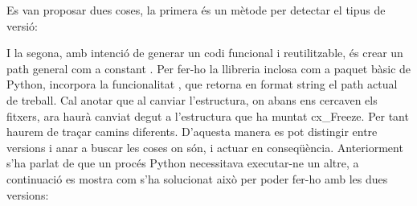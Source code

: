\documentclass[letterpaper,11pt,catalan]{sphinxmanual}
\begin{document}
Es van proposar dues coses, la primera és un mètode per detectar el tipus de versió:

\begin{sphinxVerbatim}[commandchars=\\\{\}]
   
\end{sphinxVerbatim}

I la segona, amb intenció de generar un codi funcional i reutilitzable, és crear un path
general com a constant . Per fer-ho la llibreria  inclosa com a paquet
bàsic de Python, incorpora la funcionalitat , que retorna en format string
el path actual de treball. Cal anotar que al canviar l'estructura, on abans ens cercaven
els fitxers, ara haurà canviat degut a l'estructura que ha muntat cx\_Freeze. Per tant
haurem de traçar camins diferents. D'aquesta manera es pot distingir entre versions
i anar a buscar les coses on són, i actuar en conseqüència. Anteriorment s'ha parlat
de que un procés Python necessitava executar-ne un altre, a continuació es mostra com
s'ha solucionat això per poder fer-ho amb les dues versions:

\begin{sphinxVerbatim}[commandchars=\\\{\}]
 
       
           
          
           \PYG{p}{[}\PYG{p}{]} 
          
\end{sphinxVerbatim}
\end{document}
